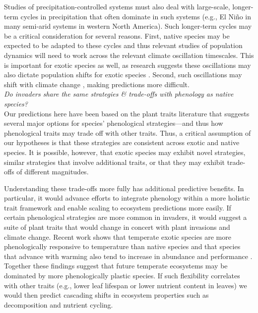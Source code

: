 \documentclass[11pt,a4paper,oneside]{article}
\begin{document}
Studies of precipitation-controlled systems must also deal with large-scale, longer-term cycles in precipitation that often dominate in such systems (e.g., El Ni\~{n}o in many semi-arid systems in western North America). Such longer-term cycles may be a critical consideration for several reasons. First, native species may be expected to be adapted to these cycles and thus relevant studies of population dynamics will need to work across the relevant climate oscillation timescales. This is important for exotic species as well, as research suggests these oscillations may also dictate population shifts for exotic species \citep{Salo:2005eo}. Second, such oscillations may shift with climate change \citep{ipccPhys2007}, making predictions more difficult.\\

\noindent \emph{Do invaders share the same strategies \& trade-offs with phenology as native species?}\\
\noindent  Our predictions here have been based on the plant traits literature that suggests several major options for species' phenological strategies---and thus how phenological traits may trade off with other traits. Thus, a critical assumption of our hypotheses is that these strategies are consistent across exotic and native species. It is possible, however, that exotic species may exhibit novel strategies, similar strategies that involve additional traits, or that they may exhibit trade-offs of different magnitudes.

Understanding these trade-offs more fully has additional predictive benefits. In particular, it would advance efforts to integrate phenology within a more holistic trait framework and enable scaling to ecosystem predictions more easily. If certain phenological strategies are more common in invaders, it would suggest a suite of plant traits that would change in concert with plant invasions and climate change. Recent work shows that temperate exotic species are more phenologically responsive to temperature than native species \citep{Willis:2010al,wolkovichAmBot2013} and that species that advance with warming also tend to increase in abundance and performance \citep{Cleland:2012vn}. Together these findings suggest that future temperate ecosystems may be dominated by more phenologically plastic species. If such flexibility correlates with other traits (e.g., lower leaf lifespan or lower nutrient content in leaves) we would then predict cascading shifts in ecosystem properties such as decomposition and nutrient cycling. \\
\end{document}
